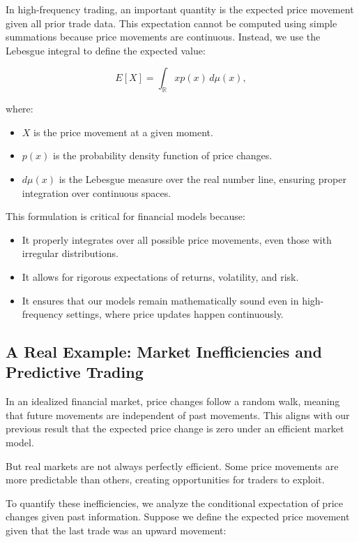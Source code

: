 In high-frequency trading, an important quantity is the expected price movement given all prior trade data. This expectation cannot be computed using simple summations because price movements are continuous. Instead, we use the Lebesgue integral to define the expected value:

\[
E[X] = \int_{\mathbb{R}} x p(x) \, d\mu(x),
\]

where:
\begin{itemize}
    \item \( X \) is the price movement at a given moment.
    \item \( p(x) \) is the probability density function of price changes.
    \item \( d\mu(x) \) is the Lebesgue measure over the real number line, ensuring proper integration over continuous spaces.
\end{itemize}

This formulation is critical for financial models because:

\begin{itemize}
    \item It properly integrates over all possible price movements, even those with irregular distributions.
    \item It allows for rigorous expectations of returns, volatility, and risk.
    \item It ensures that our models remain mathematically sound even in high-frequency settings, where price updates happen continuously.
\end{itemize}

\subsection{A Real Example: Market Inefficiencies and Predictive Trading}

In an idealized financial market, price changes follow a random walk, meaning that future movements are independent of past movements. This aligns with our previous result that the expected price change is zero under an efficient market model.

But real markets are not always perfectly efficient. Some price movements are more predictable than others, creating opportunities for traders to exploit.

To quantify these inefficiencies, we analyze the conditional expectation of price changes given past information. Suppose we define the expected price movement given that the last trade was an upward movement:

